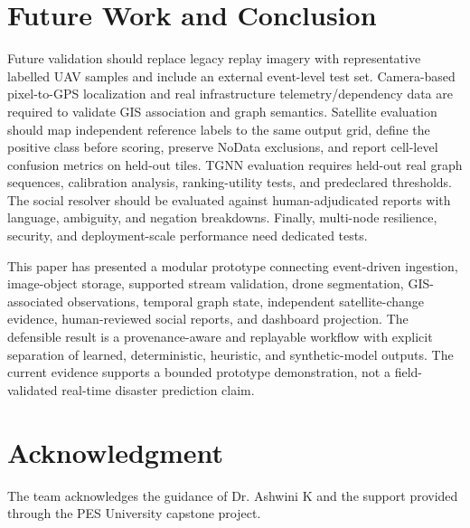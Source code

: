 \documentclass[conference]{IEEEtran}
\begin{document}
\section{Future Work and Conclusion}
Future validation should replace legacy replay imagery with representative labelled UAV samples and include an external event-level test set. Camera-based pixel-to-GPS localization and real infrastructure telemetry/dependency data are required to validate GIS association and graph semantics. Satellite evaluation should map independent reference labels to the same output grid, define the positive class before scoring, preserve NoData exclusions, and report cell-level confusion metrics on held-out tiles. TGNN evaluation requires held-out real graph sequences, calibration analysis, ranking-utility tests, and predeclared thresholds. The social resolver should be evaluated against human-adjudicated reports with language, ambiguity, and negation breakdowns. Finally, multi-node resilience, security, and deployment-scale performance need dedicated tests.

This paper has presented a modular prototype connecting event-driven ingestion, image-object storage, supported stream validation, drone segmentation, GIS-associated observations, temporal graph state, independent satellite-change evidence, human-reviewed social reports, and dashboard projection. The defensible result is a provenance-aware and replayable workflow with explicit separation of learned, deterministic, heuristic, and synthetic-model outputs. The current evidence supports a bounded prototype demonstration, not a field-validated real-time disaster prediction claim.

\section*{Acknowledgment}
The team acknowledges the guidance of Dr. Ashwini K and the support provided through the PES University capstone project.
\end{document}

